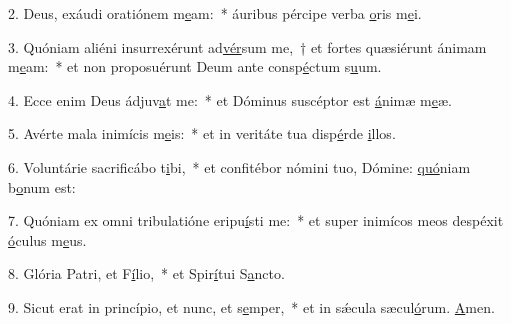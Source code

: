 2. Deus, exáudi oratiónem m\uline{e}am:~* áuribus pércipe verba \uline{o}ris m\uline{e}i.\par 
3. Quóniam aliéni insurrexérunt ad\uline{vér}sum me,~† et fortes quæsiérunt ánimam m\uline{e}am:~* et non proposuérunt Deum ante consp\uline{é}ctum s\uline{u}um.\par 
4. Ecce enim Deus ádjuv\uline{a}t me:~* et Dóminus suscéptor est \uline{á}nimæ m\uline{e}æ.\par 
5. Avérte mala inimícis m\uline{e}is:~* et in veritáte tua disp\uline{é}rde \uline{i}llos.\par 
6. Voluntárie sacrificábo t\uline{i}bi,~* et confitébor nómini tuo, Dómine: \uline{quó}niam b\uline{o}num est:\par 
7. Quóniam ex omni tribulatióne eripu\uline{í}sti me:~* et super inimícos meos despéxit \uline{ó}culus m\uline{e}us.\par 
8. Glória Patri, et F\uline{í}lio,~* et Spir\uline{í}tui S\uline{a}ncto.\par 
9. Sicut erat in princípio, et nunc, et s\uline{e}mper,~* et in sǽcula sæcul\uline{ó}rum. \uline{A}men.\par 
